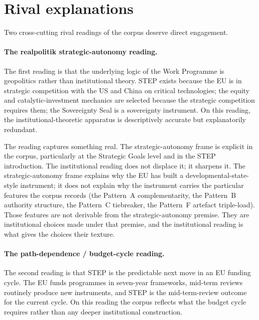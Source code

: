 \section{Rival explanations}
\label{sec:disc-rival}

Two cross-cutting rival readings of the corpus deserve direct
engagement.

\paragraph{The realpolitik strategic-autonomy reading.}
The first reading is that the underlying logic of the Work Programme
is geopolitics rather than institutional theory. STEP exists because
the EU is in strategic competition with the US and China on critical
technologies; the equity and catalytic-investment mechanics are
selected because the strategic competition requires them; the
Sovereignty Seal is a sovereignty instrument. On this reading, the
institutional-theoretic apparatus is descriptively accurate but
explanatorily redundant.

The reading captures something real. The strategic-autonomy frame is
explicit in the corpus, particularly at the Strategic Goals level and
in the STEP introduction. The institutional reading does not displace
it; it sharpens it. The strategic-autonomy frame explains why the EU
has built a developmental-state-style instrument; it does not explain
why the instrument carries the particular features the corpus records
(the Pattern~A complementarity, the Pattern~B authority structure, the
Pattern~C tiebreaker, the Pattern~F artefact triple-load). Those
features are not derivable from the strategic-autonomy premise. They
are institutional choices made under that premise, and the
institutional reading is what gives the choices their texture.

\paragraph{The path-dependence / budget-cycle reading.}
The second reading is that STEP is the predictable next move in an EU
funding cycle. The EU funds programmes in seven-year frameworks,
mid-term reviews routinely produce new instruments, and STEP is the
mid-term-review outcome for the current cycle. On this reading the
corpus reflects what the budget cycle requires rather than any deeper
institutional construction.

